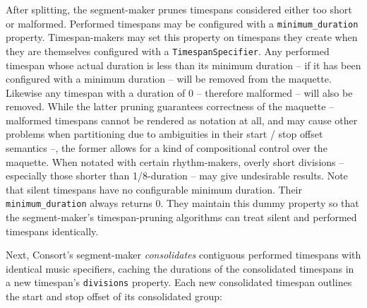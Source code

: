 \noindent After splitting, the segment-maker prunes timespans considered either
too short or malformed. Performed timespans may be configured with a
\texttt{minimum\_duration} property. Timespan-makers may set this property on
timespans they create when they are themselves configured with a
\texttt{TimespanSpecifier}. Any performed timespan whose actual duration is
less than its minimum duration -- if it has been configured with a minimum
duration -- will be removed from the maquette. Likewise any timespan with a
duration of 0 -- therefore malformed -- will also be removed. While the latter
pruning guarantees correctness of the maquette -- malformed timespans cannot be
rendered as notation at all, and may cause other problems when partitioning due
to ambiguities in their start / stop offset semantics --, the former allows for
a kind of compositional control over the maquette. When notated with certain
rhythm-makers, overly short divisions -- especially those shorter than
1/8-duration -- may give undesirable results. Note that silent timespans have
no configurable minimum duration. Their \texttt{minimum\_duration} always
returns 0. They maintain this dummy property so that the segment-maker's
timespan-pruning algorithms can treat silent and performed timespans
identically.

Next, Consort's segment-maker \emph{consolidates} contiguous performed
timespans with identical music specifiers, caching the durations of the
consolidated timespans in a new timespan's \texttt{divisions} property. Each
new consolidated timespan outlines the start and stop offset of its
consolidated group:

\begin{comment}
<abjad>
timespans = timespantools.TimespanInventory([
    consort.PerformedTimespan(
        start_offset=0,
        stop_offset=10,
        music_specifier='foo',
        ),
    consort.PerformedTimespan(
        start_offset=10,
        stop_offset=20,
        music_specifier='foo',
        ),
    consort.PerformedTimespan(
        start_offset=20,
        stop_offset=25,
        music_specifier='bar',
        ),
    consort.PerformedTimespan(
        start_offset=40,
        stop_offset=50,
        music_specifier='bar',
        ),
    consort.PerformedTimespan(
        start_offset=50,
        stop_offset=58,
        music_specifier='bar',
        ),
    ])
show(timespans)
consolidated_timespans = consort.SegmentMaker.consolidate_timespans(timespans)
show(consolidated_timespans)
</abjad>
\end{comment}

